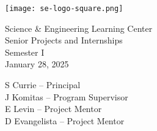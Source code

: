 \vspace*{\fill}
\begin{center}
\texttt{[image: se-logo-square.png]}
\end{center}
\vspace{1em}
\begin{center}
\large{Science \& Engineering Learning Center}\\
Senior Projects and Internships\\
Semester I\\
January 28, 2025
\end{center}
\vfill
\begin{center}
\large{
S Currie -- Principal\\
J Komitas -- Program Supervisor\\
E Levin -- Project Mentor\\
D Evangelista -- Project Mentor}
\end{center}
\vspace*{\fill}
